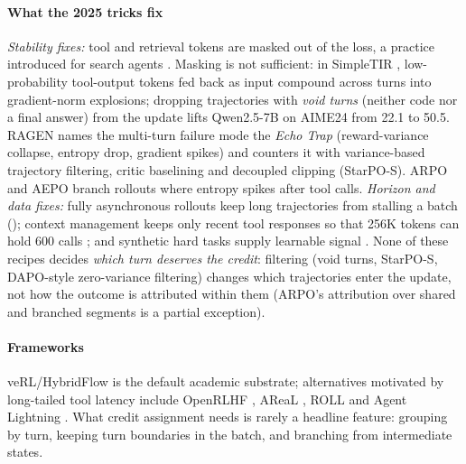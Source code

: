 \paragraph{What the 2025 tricks fix}
\emph{Stability fixes:} tool and retrieval tokens are masked out of the loss, a practice introduced for search agents \citep{jin2025search}\unverified. Masking is not sufficient: in SimpleTIR \citep{xue2025simpletir}, low-probability tool-output tokens fed back as input compound across turns into gradient-norm explosions; dropping trajectories with \emph{void turns} (neither code nor a final answer) from the update lifts Qwen2.5-7B on AIME24 from 22.1 to 50.5. RAGEN \citep{wang2025ragen} names the multi-turn failure mode the \emph{Echo Trap} (reward-variance collapse, entropy drop, gradient spikes) and counters it with variance-based trajectory filtering, critic baselining and decoupled clipping (StarPO-S). ARPO \citep{dong2025agentic} and AEPO \citep{dong2025agenticentropy} branch rollouts where entropy spikes after tool calls. \emph{Horizon and data fixes:} fully asynchronous rollouts keep long trajectories from stalling a batch (\citealp{gao2025beyond,fu2025areal}); context management keeps only recent tool responses so that 256K tokens can hold 600 calls \citep{miromind2025mirothinker}; and synthetic hard tasks supply learnable signal \citep{li2025websailor}. None of these recipes decides \emph{which turn deserves the credit}: filtering (void turns, StarPO-S, DAPO-style zero-variance filtering) changes which trajectories enter the update, not how the outcome is attributed within them (ARPO's attribution over shared and branched segments is a partial exception\unverified).

\paragraph{Frameworks}
veRL/HybridFlow \citep{sheng2025hybridflow} is the default academic substrate; alternatives motivated by long-tailed tool latency include OpenRLHF \citep{hu2024openrlhf}, AReaL \citep{fu2025areal}, ROLL \citep{wang2025reinforcement} and Agent Lightning \citep{luo2025agent}. What credit assignment needs is rarely a headline feature: grouping by turn, keeping turn boundaries in the batch, and branching from intermediate states.

